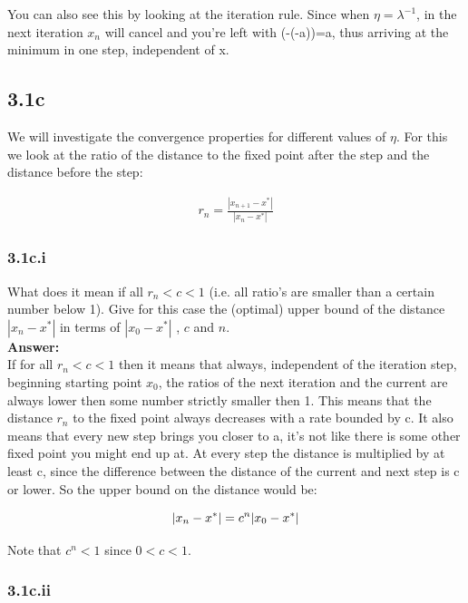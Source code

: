 \documentclass[a4paper]{article}
\begin{document}
You can also see this by looking at the iteration rule. Since when $\eta = \lambda^{-1}$, in the next iteration $x_n$ will cancel and you're left with (-(-a))=a, thus arriving at the minimum in one step, independent of x. 

\subsection*{3.1c}

We will investigate the convergence properties for different values of $\eta$. For this we look at the ratio of the distance to the fixed point after the step and the distance before the step:
 
\begin{eqnarray}
r_n = \frac{|x_{n+1} - x^*|}{|x_n - x^*|}
\end{eqnarray}

\subsubsection*{3.1c.i}

What does it mean if all $r_n < c < 1$ (i.e. all ratio’s are smaller than a certain number below 1). Give for this case the (optimal) upper bound of the distance $|x_n - x^*|$ in terms of $|x_0 - x^*|$ , $c$ and $n$.\\

\textbf{Answer:}\\

If for all $r_n < c < 1$ then it means that always, independent of the iteration step, beginning starting point $x_0$, the ratios of the next iteration and the current are always lower then some number strictly smaller then 1. This means that the distance $r_n$ to the fixed point always decreases with a rate bounded by c. It also means that every new step brings you closer to a, it's not like there is some other fixed point you might end up at.
\newpage 
At every step the distance is multiplied by at least c, since the difference between the distance of the current and next step is c or lower. So the upper bound on the distance would be:

\begin{equation}
\abs{x_n-x^*} = c^n \abs{x_0 - x^{*}}
\end{equation}

Note that $c^n < 1$ since $ 0 < c < 1$.


\subsubsection*{3.1c.ii}
\end{document}
